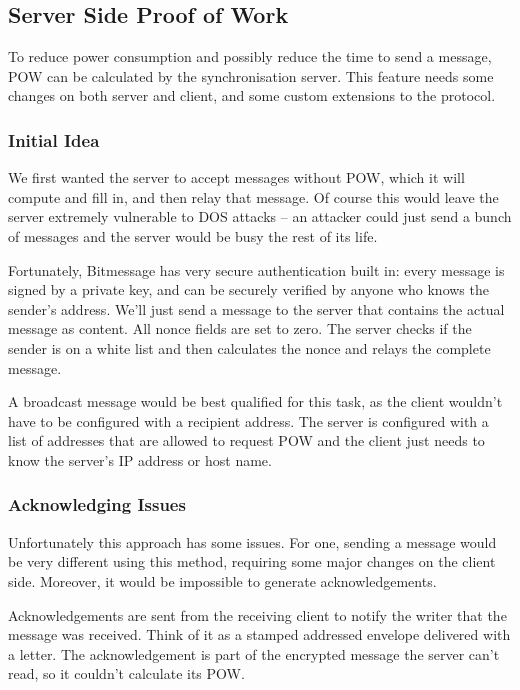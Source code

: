 \documentclass{bfh}
\begin{document}
  \subsection{Server Side Proof of Work}
  To reduce power consumption and possibly reduce the time to send a message, \ac{POW} can be calculated by the synchronisation server. This feature needs some changes on both server and client, and some custom extensions to the protocol.

  \subsubsection{Initial Idea}
  We first wanted the server to accept messages without \ac{POW}, which it will compute and fill in, and then relay that message. Of course this would leave the server extremely vulnerable to \ac{DOS} attacks -- an attacker could just send a bunch of messages and the server would be busy the rest of its life.

  Fortunately, Bitmessage has very secure authentication built in: every message is signed by a private key, and can be securely verified by anyone who knows the sender's address. We'll just send a message to the server that contains the actual message as content. All nonce fields are set to zero. The server checks if the sender is on a white list and then calculates the nonce and relays the complete message.

  A broadcast message would be best qualified for this task, as the client wouldn't have to be configured with a recipient address. The server is configured with a list of addresses that are allowed to request \ac{POW} and the client just needs to know the server's IP address or host name.

  \subsubsection{Acknowledging Issues}
  Unfortunately this approach has some issues. For one, sending a message would be very different using this method, requiring some major changes on the client side. Moreover, it would be impossible to generate acknowledgements.

  Acknowledgements are sent from the receiving client to notify the writer that the message was received. Think of it as a stamped addressed envelope delivered with a letter. The acknowledgement is part of the encrypted message the server can't read, so it couldn't calculate its \ac{POW}.
\end{document}
